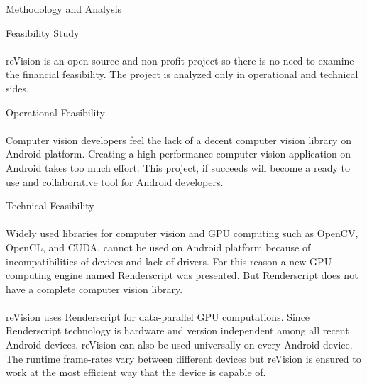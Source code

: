 \documentclass[12pt, a4paper]{article} \pagenumbering{gobble}
\begin{document}
\newpage

\begin{section}{Methodology and Analysis}
  \begin{subsection}{Feasibility Study}
    \paragraph{}{reVision is an open source and non-profit project so there is no need to examine the financial feasibility. The project is analyzed only in operational and technical sides.}
    \begin{subsubsection}{Operational Feasibility}
      \paragraph{}{Computer vision developers feel the lack of a decent computer vision library on Android platform. Creating a high performance computer vision application on Android takes too much effort. This project, if succeeds will become a ready to use and collaborative tool for Android developers.}
    \end{subsubsection}

    \begin{subsubsection}{Technical Feasibility}
      \paragraph{}{Widely used libraries for computer vision and GPU computing such as OpenCV, OpenCL, and CUDA, cannot be used on Android platform because of incompatibilities of devices and lack of drivers. For this reason a new GPU computing engine named Renderscript was presented. But Renderscript does not have a complete computer vision library.}
      \paragraph{}{reVision uses Renderscript for data-parallel GPU computations. Since Renderscript technology is hardware and version independent among all recent Android devices, reVision can also be used universally on every Android device. The runtime frame-rates vary between different devices but reVision is ensured to work at the most efficient way that the device is capable of.}
    \end{subsubsection}
  \end{subsection}
\end{section}
\end{document}
